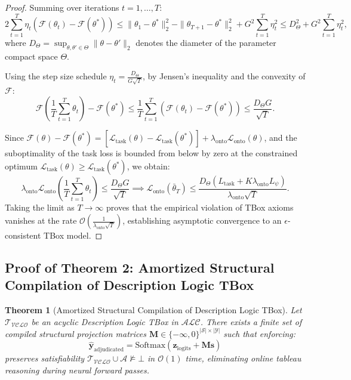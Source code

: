 \documentclass[11pt,a4paper]{article}
\newtheorem*{theorem*}{Theorem}
\begin{document}
\begin{proof}
Summing over iterations $t = 1, \dots, T$:
\begin{equation}
2 \sum_{t=1}^T \eta_t (\mathcal{F}(\theta_t) - \mathcal{F}(\theta^*)) \le \|\theta_1 - \theta^*\|_2^2 - \|\theta_{T+1} - \theta^*\|_2^2 + G^2 \sum_{t=1}^T \eta_t^2 \le D_\Theta^2 + G^2 \sum_{t=1}^T \eta_t^2,
\end{equation}
where $D_\Theta = \sup_{\theta, \theta' \in \Theta} \|\theta - \theta'\|_2$ denotes the diameter of the parameter compact space $\Theta$.

Using the step size schedule $\eta_t = \frac{D_\Theta}{G \sqrt{T}}$, by Jensen's inequality and the convexity of $\mathcal{F}$:
\begin{equation}
\mathcal{F}\left( \frac{1}{T} \sum_{t=1}^T \theta_t \right) - \mathcal{F}(\theta^*) \le \frac{1}{T} \sum_{t=1}^T (\mathcal{F}(\theta_t) - \mathcal{F}(\theta^*)) \le \frac{D_\Theta G}{\sqrt{T}}.
\end{equation}

Since $\mathcal{F}(\theta) - \mathcal{F}(\theta^*) = [\mathcal{L}_{\mathrm{task}}(\theta) - \mathcal{L}_{\mathrm{task}}(\theta^*)] + \lambda_{\mathrm{onto}} \mathcal{L}_{\mathrm{onto}}(\theta)$, and the suboptimality of the task loss is bounded from below by zero at the constrained optimum $\mathcal{L}_{\mathrm{task}}(\theta) \ge \mathcal{L}_{\mathrm{task}}(\theta^*)$, we obtain:
\begin{equation}
\lambda_{\mathrm{onto}} \mathcal{L}_{\mathrm{onto}}\left( \frac{1}{T} \sum_{t=1}^T \theta_t \right) \le \frac{D_\Theta G}{\sqrt{T}} \implies \mathcal{L}_{\mathrm{onto}}\left( \bar{\theta}_T \right) \le \frac{D_\Theta (L_{\mathrm{task}} + K \lambda_{\mathrm{onto}} L_\psi)}{\lambda_{\mathrm{onto}} \sqrt{T}}.
\end{equation}
Taking the limit as $T \to \infty$ proves that the empirical violation of TBox axioms vanishes at the rate $\mathcal{O}\left( \frac{1}{\lambda_{\mathrm{onto}} \sqrt{T}} \right)$, establishing asymptotic convergence to an $\epsilon$-consistent TBox model.
\end{proof}

\subsection{Proof of Theorem 2: Amortized Structural Compilation of Description Logic TBox}
\label{proof:thm2}

\begin{theorem*}[Amortized Structural Compilation of Description Logic TBox]
Let $\mathcal{T}_{\mathcal{VCLO}}$ be an acyclic Description Logic TBox in $\mathcal{ALC}$. There exists a finite set of compiled structural projection matrices $\mathbf{M} \in \{-\infty, 0\}^{|\mathcal{S}| \times |\mathcal{Y}|}$ such that enforcing:
\begin{equation}
\hat{\mathbf{y}}_{\mathrm{adjudicated}} = \mathrm{Softmax}(\mathbf{z}_{\mathrm{logits}} + \mathbf{M} \mathbf{s})
\end{equation}
preserves satisfiability $\mathcal{T}_{\mathcal{VCLO}} \cup \mathcal{A} \not\models \bot$ in $\mathcal{O}(1)$ time, eliminating online tableau reasoning during neural forward passes.
\end{theorem*}
\end{document}
